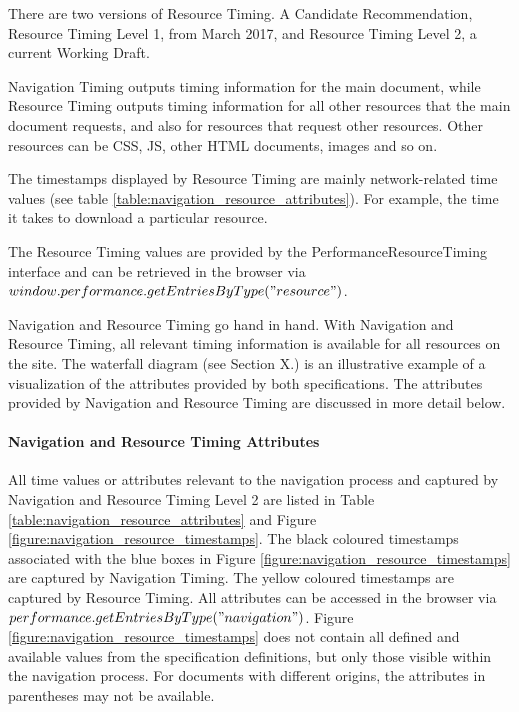 There are two versions of Resource Timing.
A Candidate Recommendation, Resource Timing Level 1, from March 2017, %
and Resource Timing Level 2, a current Working Draft. %

Navigation Timing outputs timing information for the main document, while Resource Timing outputs timing information for all other resources that the main document requests, and also for resources that request other resources.
Other resources can be CSS, JS, other HTML documents, images and so on.

The timestamps displayed by Resource Timing are mainly network-related time values (see table \ref{table:navigation_resource_attributes}).
For example, the time it takes to download a particular resource.


The Resource Timing values are provided by the PerformanceResourceTiming interface and can be retrieved in the browser via $window.performance.getEntriesByType("resource")$.



Navigation and Resource Timing go hand in hand.
With Navigation and Resource Timing, all relevant timing information is available for all resources on the site.
The waterfall diagram (see Section X.) is an illustrative example of a visualization of the attributes provided by both specifications.
The attributes provided by Navigation and Resource Timing are discussed in more detail below.



\paragraph{Navigation and Resource Timing Attributes} %

All time values or attributes relevant to the navigation process and captured by Navigation and Resource Timing Level 2 are listed in Table \ref{table:navigation_resource_attributes} and Figure \ref{figure:navigation_resource_timestamps}.
The black coloured timestamps associated with the blue boxes in Figure \ref{figure:navigation_resource_timestamps} are captured by Navigation Timing.
The yellow coloured timestamps are captured by Resource Timing.
All attributes can be accessed in the browser via $performance.getEntriesByType("navigation")$.
Figure \ref{figure:navigation_resource_timestamps} does not contain all defined and available values from the specification definitions, but only those visible within the navigation process.
For documents with different origins, the attributes in parentheses may not be available. %


